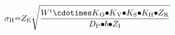 \[{\sigma }_{\mathrm{H}}\mathrm{=}Z_{\mathrm{E}}\sqrt{\frac{W^{\mathrm{t}}{\mathrm{\cdotimes }K}_{\mathrm{O}}{\mathrm{\bullet }K}_{\mathrm{V}}\mathrm{\bullet }K_{\mathrm{S}}\mathrm{\bullet }K_{\mathrm{H}}\mathrm{\bullet }Z_{\mathrm{R}}}{D_{\mathrm{P}}\mathrm{\bullet }b\mathrm{\bullet }Z_{\mathrm{I}}}}\] 